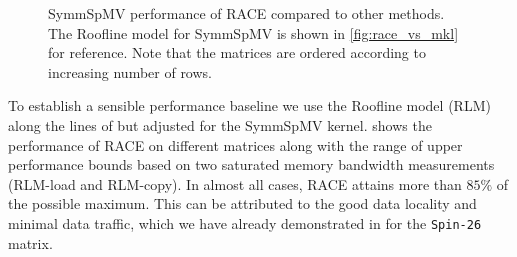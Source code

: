 \begin{figure}[tb]
	\caption{\label{fig:symm_spmv_perf} \acrshort{SymmSpMV} performance of \acrshort{RACE} compared to 
		other methods. The Roof{}line model for \acrshort{SymmSpMV} is shown in 
		\cref{fig:race_vs_mkl} for reference. Note that the matrices are ordered according 
		to increasing number of rows.}
\end{figure}
To establish a sensible performance baseline we use the Roof{}line  model (RLM)
\cite{Williams_roofline} along the lines of \cite{Moritz_sell} but adjusted
for the \acrshort{SymmSpMV} kernel.  shows the performance of \acrshort{RACE}
on different matrices along with the range of upper performance bounds based on two saturated memory bandwidth measurements (RLM-load and RLM-copy). 
In almost all cases, \acrshort{RACE} attains more than $85\%$ of the possible maximum. 
This can be attributed to the good data locality and minimal data traffic, which we have already demonstrated in  for the \texttt{Spin-26} matrix. 
 
